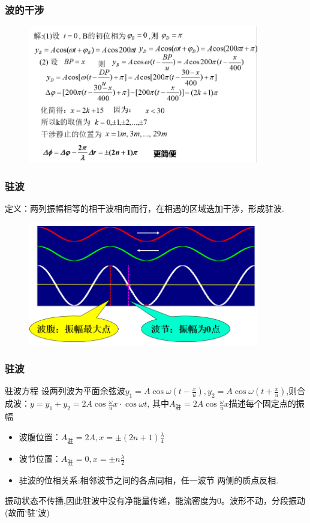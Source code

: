 \documentclass[UTF8]{ctexbeamer}
\begin{document}
\begin{frame}
	\frametitle{波的干涉}
		\begin{figure}[!ht]
			\centering
			\includegraphics[width=0.9\textwidth]{7}
		\end{figure}
\end{frame}
\begin{frame}
\frametitle{驻波}
定义：两列振幅相等的相干波相向而行，在相遇的区域迭加干涉，形成驻波.
		\begin{figure}[!ht]
	\centering
	\includegraphics[width=0.9\textwidth]{8}
\end{figure}
\end{frame}
\begin{frame}
\frametitle{驻波}
\begin{block}{驻波方程}
	设两列波为平面余弦波$y_1=A\cos\omega(t-\frac xu),y_2=A\cos\omega(t+\frac xu)$,则合成波：$y=y_1+y_2=2A\cos\frac\omega ux\cdot\cos\omega t$, 其中$A_{\text{驻}}=2A\cos\frac\omega ux$描述每个固定点的振幅
\end{block}
\begin{itemize}
	\item 波腹位置：$A_{\text{驻}}=2A,x=\pm(2n+1)\frac\lambda4$
	\item 波节位置：$A_{\text{驻}}=0,x=\pm n\frac\lambda2$
	\item 驻波的位相关系:相邻波节之间的各点同相，任一波节
	两侧的质点反相.
\end{itemize}
振动状态不传播,因此驻波中没有净能量传递，能流密度为0。波形不动，分段振动(故而‘驻’波)
\end{frame}
\end{document}
